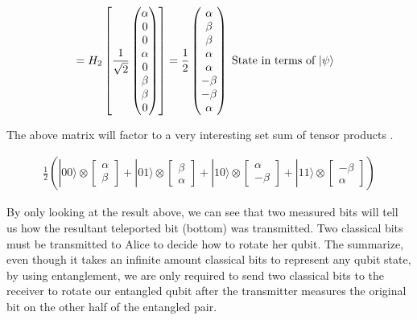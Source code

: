 \documentclass[conference]{IEEEtran}
\begin{document}
\begin{align*}
&= H_2 \left [ \frac{1}{\sqrt{2}} \begin{pmatrix} \alpha \\ 0 \\ 0 \\ \alpha \\ 0 \\ \beta \\ \beta \\ 0 \end{pmatrix} \right ] = \frac{1}{2} \begin{pmatrix} \alpha \\ \beta \\ \beta \\ \alpha \\ \alpha \\ -\beta \\ -\beta \\ \alpha \end{pmatrix} \; \text{State in terms of $\ket{\psi}$}
\end{align*}

The above matrix will factor to a very interesting set sum of tensor products \cite{b9}.

\begin{gather*}
\frac{1}{2} \left ( |00\rangle \otimes \begin{bmatrix} \alpha \\ \beta \end{bmatrix}
+ |01\rangle \otimes \begin{bmatrix} \beta \\ \alpha \end{bmatrix}
+ |10\rangle \otimes \begin{bmatrix} \alpha \\ -\beta \end{bmatrix}
+ |11\rangle \otimes \begin{bmatrix} -\beta \\ \alpha \end{bmatrix} \right )
\end{gather*}

By only looking at the result above, we can see that two measured bits will tell us how the resultant teleported bit (bottom) was transmitted. Two classical bits must be transmitted to Alice to decide how to rotate her qubit. The summarize, even though it takes an infinite amount classical bits to represent any qubit state, by using entanglement, we are only required to send two classical bits to the receiver to rotate our entangled qubit after the transmitter measures the original bit on the other half of the entangled pair.
\end{document}
